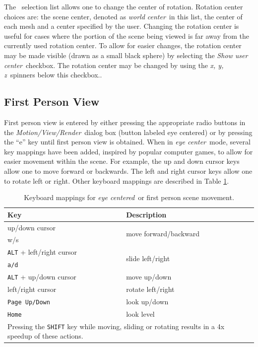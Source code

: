 \documentclass[11pt,twoside]{book}
\newcommand{\frameit}[1]{\fbox{\tt #1}}
\begin{document}
The \frameit{Rotate about}\ selection list allows one to change the center of rotation.
Rotation center choices are: the scene center, denoted as {\em world center}\ in this list, the center of each mesh and a center specified by the user.
Changing the rotation center is useful for cases where the portion of the scene being viewed is far away from the currently used rotation center.
To allow for easier changes, the rotation center may be made visible (drawn as a small black sphere) by selecting the {\em Show user center}\ checkbox.  The rotation center may be changed by using the
{\em x, y, z}\ spinners below this checkbox..

\subsection{First Person View}
\label{section:eyeview}
First person view is entered by either pressing the appropriate
radio buttons in the {\em Motion/View/Render}\ dialog box (button
labeled eye centered) or by pressing the ``e'' key until first
person view is obtained. When in {\em eye center}\ mode, several
key mappings have been added, inspired by popular computer games,
to allow for easier movement within the scene. For example, the up
and down cursor keys allow one to move forward or backwards.  The
left and right cursor keys allow one to rotate left or right.
Other keyboard mappings are described in Table \ref{tabKEYS}.

\begin{table}[\figoptions]
\begin{center}
\caption{Keyboard mappings for {\em eye centered}\ or first person scene movement.}
\vspace{0.1in}
\begin{tabular}{|l|l|}
\hline Key &   Description  \\

\hline\hline
up/down cursor & \multirow{2}{*}{move forward/backward}  \\
w/s &   \\\hline
{\tt ALT} + left/right cursor  & \multirow{2}{*}{slide left/right} \\
{\tt a/d}  &  \\ \hline
{\tt ALT} + up/down cursor  & move up/down  \\ \hline\hline
left/right cursor  & rotate left/right \\ \hline
{\tt Page Up/Down}  & look up/down \\ \hline
{\tt Home}  & look level \\ \hline\hline
\multicolumn{2}{|p{3.5in}|}{Pressing the {\tt SHIFT} key while moving, sliding or rotating
results in a  4x speedup of these actions. } \\ \hline

\end{tabular}
\label{tabKEYS}
\end{center}
\end{table}
\end{document}
